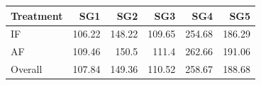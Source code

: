 \begin{tabular}{lrrrrr}
  \toprule
  Treatment & SG1 & SG2 & SG3 & SG4 & SG5 \\ 
  \midrule
  IF & 106.22 & 148.22 & 109.65 & 254.68 & 186.29 \\ 
  AF & 109.46 & 150.5 & 111.4 & 262.66 & 191.06 \\ 
  Overall & 107.84 & 149.36 & 110.52 & 258.67 & 188.68 \\ 
  \bottomrule
\end{tabular}
